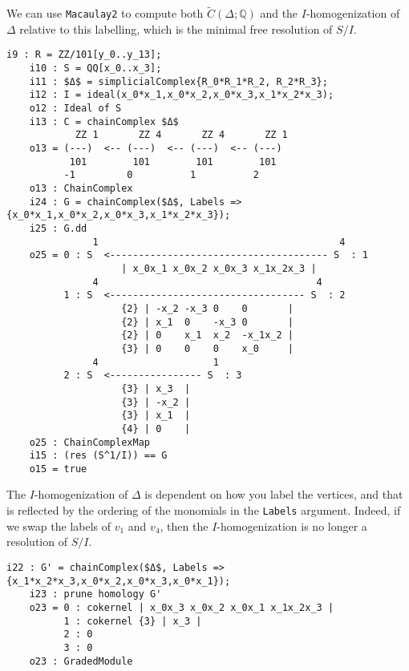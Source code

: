 \documentclass[12pt,leqno]{amsart}
\theoremstyle{definition}
\begin{document}
We can use \texttt{Macaulay2} to compute both
$\widetilde C(\Delta; \mathbb Q)$ and the $I$-homogenization of $\Delta$
relative to this labelling, which is the minimal free resolution of $S/I$.
%
\begin{lstlisting}[basicstyle={\ttfamily \scriptsize}, xleftmargin=-23pt]
    i9 : R = ZZ/101[y_0..y_13];
    i10 : S = QQ[x_0..x_3];
    i11 : $Δ$ = simplicialComplex{R_0*R_1*R_2, R_2*R_3};
    i12 : I = ideal(x_0*x_1,x_0*x_2,x_0*x_3,x_1*x_2*x_3);
    o12 : Ideal of S
    i13 : C = chainComplex $Δ$
            ZZ 1       ZZ 4       ZZ 4       ZZ 1
    o13 = (---)  <-- (---)  <-- (---)  <-- (---)
           101        101        101        101
          -1         0          1          2
    o13 : ChainComplex
    i24 : G = chainComplex($Δ$, Labels => {x_0*x_1,x_0*x_2,x_0*x_3,x_1*x_2*x_3});
    i25 : G.dd
               1                                          4
    o25 = 0 : S  <-------------------------------------- S  : 1
                    | x_0x_1 x_0x_2 x_0x_3 x_1x_2x_3 |
               4                                      4
          1 : S  <---------------------------------- S  : 2
                    {2} | -x_2 -x_3 0    0       |
                    {2} | x_1  0    -x_3 0       |
                    {2} | 0    x_1  x_2  -x_1x_2 |
                    {3} | 0    0    0    x_0     |
               4                    1
          2 : S  <---------------- S  : 3
                    {3} | x_3  |
                    {3} | -x_2 |
                    {3} | x_1  |
                    {4} | 0    |
    o25 : ChainComplexMap
    i15 : (res (S^1/I)) == G
    o15 = true
\end{lstlisting}
%
The $I$-homogenization of $\Delta$ is dependent on how you label the vertices,
and that is reflected by the ordering of the monomials in the \texttt{Labels}
argument. Indeed, if we swap the labels of $v_1$ and $v_4$, then the
$I$-homogenization is no longer a resolution of $S/I$.
%
\begin{lstlisting}[basicstyle={\ttfamily \scriptsize}, xleftmargin=-23pt]
    i22 : G' = chainComplex($Δ$, Labels => {x_1*x_2*x_3,x_0*x_2,x_0*x_3,x_0*x_1});
    i23 : prune homology G'
    o23 = 0 : cokernel | x_0x_3 x_0x_2 x_0x_1 x_1x_2x_3 |
          1 : cokernel {3} | x_3 |                       
          2 : 0                                          
          3 : 0                                          
    o23 : GradedModule
\end{lstlisting}
\end{document}
